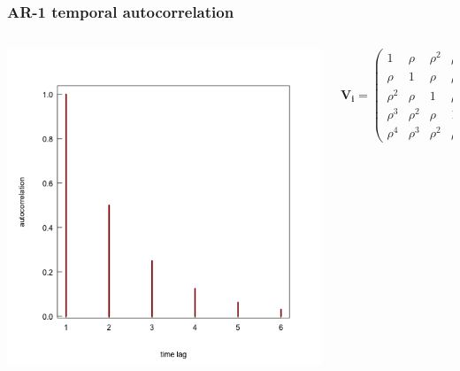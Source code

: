 \documentclass{beamer}
\begin{document}
\begin{frame}
\frametitle{AR-1 temporal autocorrelation}
    \begin{columns}
        \begin{column}{0.5\textwidth}
            \includegraphics[width=\textwidth]{lectures/day_10_GLMMs/figures/unnamed-chunk-6-1.png}
        \end{column}
        \begin{column}{0.5\textwidth}
        \begin{equation*}
            \mathbf{V_i} = \left( \begin{array}{ccccc}
1 & \rho & \rho^2 & \rho^3 & \rho^4 \\
\rho & 1 & \rho & \rho^2 & \rho^3 \\
\rho^2 & \rho & 1 & \rho & \rho^2 \\
\rho^3 & \rho^2 & \rho & 1 & \rho \\
\rho^4 & \rho^3 & \rho^2 & \rho & 1
        \end{array} \right)
        \end{equation*}
        
        \end{column}
    \end{columns}
\end{frame}
\end{document}
